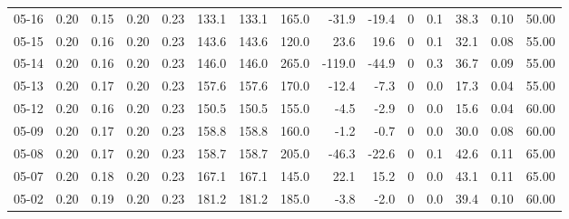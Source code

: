 \begin{threeparttable}
{\begin{tabular}{lrrrrrrrrrrrrrr}
  05-16 &          0.20 &          0.15 &          0.20 &        0.23 &               133.1 &              133.1 &               165.0 &      -31.9 &        -19.4 &              0 &                 0.1 &             38.3 &            0.10 &                  50.00 \\
  05-15 &          0.20 &          0.16 &          0.20 &        0.23 &               143.6 &              143.6 &               120.0 &       23.6 &         19.6 &              0 &                 0.1 &             32.1 &            0.08 &                  55.00 \\
  05-14 &          0.20 &          0.16 &          0.20 &        0.23 &               146.0 &              146.0 &               265.0 &     -119.0 &        -44.9 &              0 &                 0.3 &             36.7 &            0.09 &                  55.00 \\
  05-13 &          0.20 &          0.17 &          0.20 &        0.23 &               157.6 &              157.6 &               170.0 &      -12.4 &         -7.3 &              0 &                 0.0 &             17.3 &            0.04 &                  55.00 \\
  05-12 &          0.20 &          0.16 &          0.20 &        0.23 &               150.5 &              150.5 &               155.0 &       -4.5 &         -2.9 &              0 &                 0.0 &             15.6 &            0.04 &                  60.00 \\
  05-09 &          0.20 &          0.17 &          0.20 &        0.23 &               158.8 &              158.8 &               160.0 &       -1.2 &         -0.7 &              0 &                 0.0 &             30.0 &            0.08 &                  60.00 \\
  05-08 &          0.20 &          0.17 &          0.20 &        0.23 &               158.7 &              158.7 &               205.0 &      -46.3 &        -22.6 &              0 &                 0.1 &             42.6 &            0.11 &                  65.00 \\
  05-07 &          0.20 &          0.18 &          0.20 &        0.23 &               167.1 &              167.1 &               145.0 &       22.1 &         15.2 &              0 &                 0.0 &             43.1 &            0.11 &                  65.00 \\
  05-02 &          0.20 &          0.19 &          0.20 &        0.23 &               181.2 &              181.2 &               185.0 &       -3.8 &         -2.0 &              0 &                 0.0 &             39.4 &            0.10 &                  60.00 \\

\end{tabular}}
\end{threeparttable}
